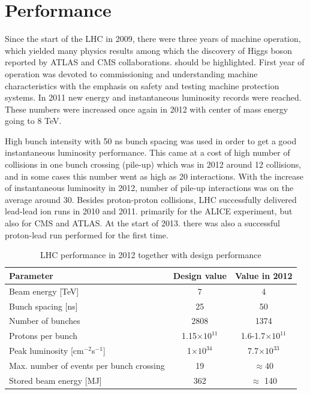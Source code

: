
\section{Performance}

Since the start of the LHC in 2009, there were three years of machine operation, which yielded many physics results among which the discovery of Higgs boson reported by ATLAS and CMS collaborations. should be highlighted. First year of operation was devoted to commissioning and understanding machine characteristics with the emphasis on safety and testing machine protection systems. In 2011 new energy and instantaneous luminosity records were reached. These numbers were increased once again in 2012 with center of mass energy going to 8 TeV.
\par High bunch intensity with 50 ns bunch spacing was used in order to get a good instantaneous luminosity performance. This came at a cost of high number of collisions in one bunch crossing (pile-up) which was in 2012 around 12 collisions, and in some cases this number went as high as 20 interactions. With the increase of instantaneous luminosity in 2012, number of pile-up interactions was on the average around 30. Besides proton-proton collisions, LHC successfully delivered lead-lead ion runs in 2010 and 2011. primarily for the ALICE experiment, but also for CMS and ATLAS. At the start of 2013. there was also a successful proton-lead run performed for the first time. 

\begin{table}[h]
\centering
  \caption{LHC performance in 2012 together with design performance \cite{Evans:2008zzb}}
  \begin{tabular}{ l  c  c }
      \hline
      \hline
      Parameter & Design value & Value in 2012 \\
      \hline
      Beam energy [TeV] & 7 & 4 \\
      Bunch spacing [ns] & 25 & 50 \\
      Number of bunches & 2808 & 1374 \\
      Protons per bunch & 1.15$\times 10^{11}$ & 1.6-1.7$\times 10^{11}$ \\
      Peak luminosity [cm$^{-2}$s$^{-1}$] & 1$\times 10^{34}$ & 7.7$\times 10^{33}$ \\
      Max. number of events per bunch crossing & 19 & $\approx 40$ \\
      Stored beam energy [MJ] & 362 & $\approx$ 140 \\
      \hline
      \hline 
  \end{tabular}
\end{table}

